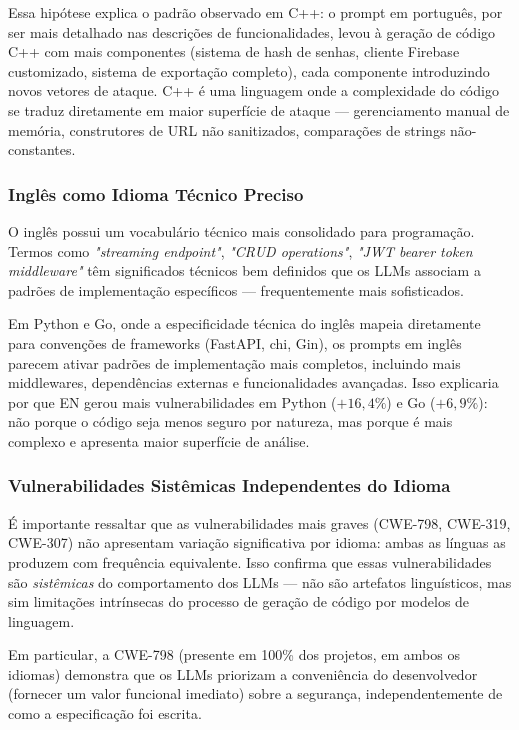 \documentclass[12pt]{article}
\begin{document}
Essa hipótese explica o padrão observado em C++: o prompt em português, por ser mais detalhado nas descrições de funcionalidades, levou à geração de código C++ com mais componentes (sistema de hash de senhas, cliente Firebase customizado, sistema de exportação completo), cada componente introduzindo novos vetores de ataque. C++ é uma linguagem onde a complexidade do código se traduz diretamente em maior superfície de ataque — gerenciamento manual de memória, construtores de URL não sanitizados, comparações de strings não-constantes.

\subsubsection{Inglês como Idioma Técnico Preciso}

O inglês possui um vocabulário técnico mais consolidado para programação. Termos como \textit{"streaming endpoint"}, \textit{"CRUD operations"}, \textit{"JWT bearer token middleware"} têm significados técnicos bem definidos que os LLMs associam a padrões de implementação específicos — frequentemente mais sofisticados.

Em Python e Go, onde a especificidade técnica do inglês mapeia diretamente para convenções de frameworks (FastAPI, chi, Gin), os prompts em inglês parecem ativar padrões de implementação mais completos, incluindo mais middlewares, dependências externas e funcionalidades avançadas. Isso explicaria por que EN gerou mais vulnerabilidades em Python ($+16,4\%$) e Go ($+6,9\%$): não porque o código seja menos seguro por natureza, mas porque é mais complexo e apresenta maior superfície de análise.

\subsubsection{Vulnerabilidades Sistêmicas Independentes do Idioma}

É importante ressaltar que as vulnerabilidades mais graves (CWE-798, CWE-319, CWE-307) não apresentam variação significativa por idioma: ambas as línguas as produzem com frequência equivalente. Isso confirma que essas vulnerabilidades são \textit{sistêmicas} do comportamento dos LLMs — não são artefatos linguísticos, mas sim limitações intrínsecas do processo de geração de código por modelos de linguagem.

Em particular, a CWE-798 (presente em 100\% dos projetos, em ambos os idiomas) demonstra que os LLMs priorizam a conveniência do desenvolvedor (fornecer um valor funcional imediato) sobre a segurança, independentemente de como a especificação foi escrita.
\end{document}
